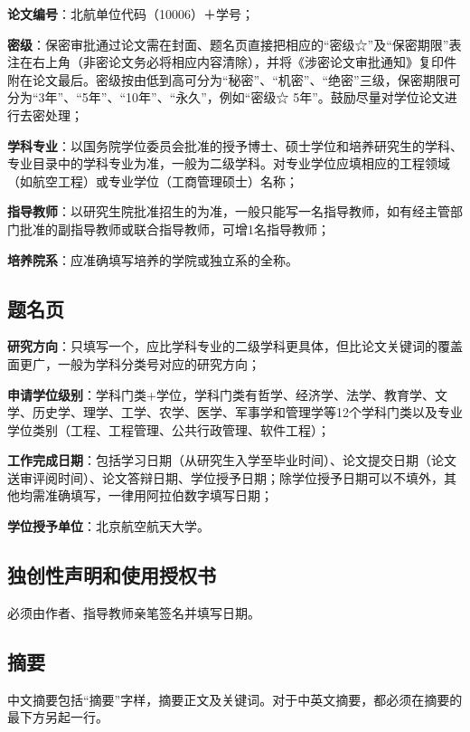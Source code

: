 {\bfseries 论文编号}：北航单位代码（10006）＋学号；

{\bfseries 密级}：保密审批通过论文需在封面、题名页直接把相应的“密级☆”及“保密期限”表注在右上角（非密论文务必将相应内容清除），并将《涉密论文审批通知》复印件附在论文最后。密级按由低到高可分为“秘密”、“机密”、“绝密”三级，保密期限可分为“3年”、“5年”、“10年”、“永久”，例如“密级☆ 5年”。鼓励尽量对学位论文进行去密处理；

{\bfseries 学科专业}：以国务院学位委员会批准的授予博士、硕士学位和培养研究生的学科、专业目录中的学科专业为准，一般为二级学科。对专业学位应填相应的工程领域（如航空工程）或专业学位（工商管理硕士）名称；

{\bfseries 指导教师}：以研究生院批准招生的为准，一般只能写一名指导教师，如有经主管部门批准的副指导教师或联合指导教师，可增1名指导教师；

{\bfseries 培养院系}：应准确填写培养的学院或独立系的全称。

\subsection{题名页}

{\bfseries 研究方向}：只填写一个，应比学科专业的二级学科更具体，但比论文关键词的覆盖面更广，一般为学科分类号对应的研究方向；

{\bfseries 申请学位级别}：学科门类+学位，学科门类有哲学、经济学、法学、教育学、文学、历史学、理学、工学、农学、医学、军事学和管理学等12个学科门类以及专业学位类别（工程、工程管理、公共行政管理、软件工程）；

{\bfseries 工作完成日期}：包括学习日期（从研究生入学至毕业时间）、论文提交日期（论文送审评阅时间）、论文答辩日期、学位授予日期；除学位授予日期可以不填外，其他均需准确填写，一律用阿拉伯数字填写日期；

{\bfseries 学位授予单位}：北京航空航天大学。

\subsection{独创性声明和使用授权书}

必须由作者、指导教师亲笔签名并填写日期。

\subsection{摘要}

中文摘要包括“摘要”字样，摘要正文及关键词。对于中英文摘要，都必须在摘要的最下方另起一行。

